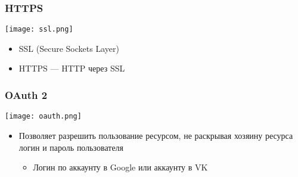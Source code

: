 \documentclass{../../slides-style}
\begin{document}

    \begin{frame}
        \frametitle{HTTPS}
        \begin{center}
            \texttt{[image: ssl.png]}
        \end{center}
        \begin{itemize}
            \item SSL (Secure Sockets Layer)
            \item HTTPS --- HTTP через SSL
        \end{itemize}
    \end{frame}

    \begin{frame}
        \frametitle{OAuth 2}
        \begin{center}
            \texttt{[image: oauth.png]}
        \end{center}
        \begin{itemize}
            \item Позволяет разрешить пользование ресурсом, не раскрывая хозяину ресурса логин и пароль пользователя
            \begin{itemize}
                \item Логин по аккаунту в Google или аккаунту в VK
            \end{itemize}
        \end{itemize}
    \end{frame}
\end{document}
